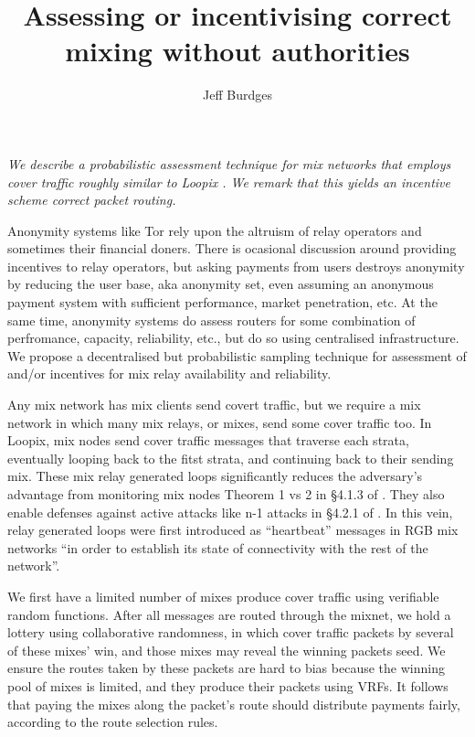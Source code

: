 ﻿\documentclass{sig-alternate-hotpets}
\title{Assessing or incentivising correct mixing without authorities} %
\author{Jeff Burdges}
\date{}
\begin{document}
\maketitle

\begin{adjustwidth}{6pt}{8pt}
\it
We describe a probabilistic assessment technique for %
mix networks that employs cover traffic roughly similar to
Loopix \cite{Loopix}.  We remark that this yields an 
incentive scheme correct packet routing.
\end{adjustwidth}
\medskip

Anonymity systems like Tor rely upon the altruism of relay operators and sometimes their financial doners.
There is ocasional discussion around providing incentives to relay operators, but asking payments from users destroys anonymity by reducing the user base, aka anonymity set, even assuming an anonymous payment system with sufficient performance, market penetration, etc.  
At the same time, anonymity systems do assess routers for some combination of perfromance, capacity, reliability, etc., but do so using centralised infrastructure. 
%
We propose a decentralised but probabilistic sampling technique for assessment of and/or incentives for mix relay availability and reliability.  

Any mix network has mix clients send covert traffic, but we require a mix network in which many mix relays, or mixes, send some cover traffic too.  
In Loopix, mix nodes send cover traffic messages that traverse each strata, eventually looping back to the fitst strata, and continuing back to their sending mix.  
These mix relay generated loops significantly reduces the adversary's advantage from monitoring mix nodes Theorem 1 vs 2 in \S4.1.3 of \cite{Loopix}.  %
They also enable defenses against active attacks like n-1 attacks in \S4.2.1 of \cite{Loopix}.  %
In this vein, relay generated loops were first introduced as ``heartbeat'' messages in RGB mix networks \cite{RGB_Heartbeat} ``in order to establish its state of connectivity with the rest of the network''.

We first have a limited number of mixes produce cover traffic using verifiable random functions.  
After all messages are routed through the mixnet, we hold a lottery using collaborative randomness, in which cover traffic packets by several of these mixes’ win, and those mixes may reveal the winning packets seed.  
We ensure the routes taken by these packets are hard to bias because the winning pool of mixes is limited, and they produce their packets using VRFs.  
It follows that paying the mixes along the packet’s route should distribute payments fairly, according to the route selection rules. 
\end{document}
